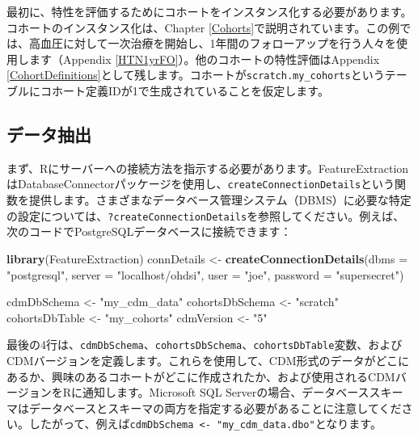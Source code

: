 \documentclass[
  11pt]{book}
\newenvironment{Shaded}{\begin{snugshade}}{\end{snugshade}}
\newcommand{\AttributeTok}[1]{\textcolor[rgb]{0.13,0.29,0.53}{#1}}
\newcommand{\FunctionTok}[1]{\textcolor[rgb]{0.13,0.29,0.53}{\textbf{#1}}}
\newcommand{\NormalTok}[1]{#1}
\newcommand{\OtherTok}[1]{\textcolor[rgb]{0.56,0.35,0.01}{#1}}
\newcommand{\StringTok}[1]{\textcolor[rgb]{0.31,0.60,0.02}{#1}}
\theoremstyle{definition}
\theoremstyle{definition}
\theoremstyle{definition}
\theoremstyle{definition}
\theoremstyle{remark}
\begin{document}
最初に、特性を評価するためにコホートをインスタンス化する必要があります。コホートのインスタンス化は、Chapter \ref{Cohorts}で説明されています。この例では、高血圧に対して一次治療を開始し、1年間のフォローアップを行う人々を使用します（Appendix \ref{HTN1yrFO}）。他のコホートの特性評価はAppendix \ref{CohortDefinitions}として残します。コホートが\texttt{scratch.my\_cohorts}というテーブルにコホート定義IDが1で生成されていることを仮定します。

\subsection{データ抽出}\label{ux30c7ux30fcux30bfux62bdux51fa}

まず、Rにサーバーへの接続方法を指示する必要があります。FeatureExtractionはDatabaseConnectorパッケージを使用し、\texttt{createConnectionDetails}という関数を提供します。さまざまなデータベース管理システム（DBMS）に必要な特定の設定については、\texttt{?createConnectionDetails}を参照してください。例えば、次のコードでPostgreSQLデータベースに接続できます：

\begin{Shaded}
\begin{Highlighting}[]
\FunctionTok{library}\NormalTok{(FeatureExtraction)}
\NormalTok{connDetails }\OtherTok{\textless{}{-}} \FunctionTok{createConnectionDetails}\NormalTok{(}\AttributeTok{dbms =} \StringTok{"postgresql"}\NormalTok{,}
                                       \AttributeTok{server =} \StringTok{"localhost/ohdsi"}\NormalTok{,}
                                       \AttributeTok{user =} \StringTok{"joe"}\NormalTok{,}
                                       \AttributeTok{password =} \StringTok{"supersecret"}\NormalTok{)}

\NormalTok{cdmDbSchema }\OtherTok{\textless{}{-}} \StringTok{"my\_cdm\_data"}
\NormalTok{cohortsDbSchema }\OtherTok{\textless{}{-}} \StringTok{"scratch"}
\NormalTok{cohortsDbTable }\OtherTok{\textless{}{-}} \StringTok{"my\_cohorts"}
\NormalTok{cdmVersion }\OtherTok{\textless{}{-}} \StringTok{"5"}
\end{Highlighting}
\end{Shaded}

最後の4行は、\texttt{cdmDbSchema}、\texttt{cohortsDbSchema}、\texttt{cohortsDbTable}変数、およびCDMバージョンを定義します。これらを使用して、CDM形式のデータがどこにあるか、興味のあるコホートがどこに作成されたか、および使用されるCDMバージョンをRに通知します。Microsoft SQL Serverの場合、データベーススキーマはデータベースとスキーマの両方を指定する必要があることに注意してください。したがって、例えば\texttt{cdmDbSchema\ \textless{}-\ "my\_cdm\_data.dbo"}となります。
\end{document}
